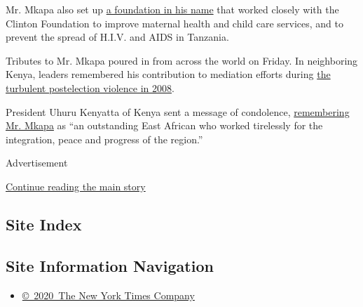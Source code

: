 Mr. Mkapa also set up \href{https://mkapafoundation.or.tz/}{a foundation
in his name} that worked closely with the Clinton Foundation to improve
maternal health and child care services, and to prevent the spread of
H.I.V. and AIDS in Tanzania.

Tributes to Mr. Mkapa poured in from across the world on Friday. In
neighboring Kenya, leaders remembered his contribution to mediation
efforts during
\href{https://www.nytimes3xbfgragh.onion/2008/02/06/world/africa/06kenya.html}{the
turbulent postelection violence in 2008}.

President Uhuru Kenyatta of Kenya sent a message of condolence,
\href{https://twitter.com/StateHouseKenya/status/1286535803238309890}{remembering
Mr. Mkapa} as ``an outstanding East African who worked tirelessly for
the integration, peace and progress of the region.''

Advertisement

\protect\hyperlink{after-bottom}{Continue reading the main story}

\hypertarget{site-index}{%
\subsection{Site Index}\label{site-index}}

\hypertarget{site-information-navigation}{%
\subsection{Site Information
Navigation}\label{site-information-navigation}}

\begin{itemize}
\tightlist
\item
  \href{https://help.nytimes3xbfgragh.onion/hc/en-us/articles/115014792127-Copyright-notice}{©~2020~The
  New York Times Company}
\end{itemize}

